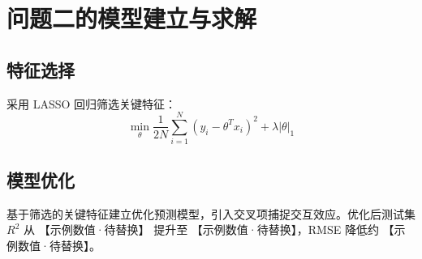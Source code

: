 \section{问题二的模型建立与求解}

\subsection{特征选择}

采用 LASSO 回归筛选关键特征：
\[
  \min_{\theta} \frac{1}{2N} \sum_{i=1}^{N} (y_i - \theta^T x_i)^2 + \lambda |\theta|_1
\]

\subsection{模型优化}

基于筛选的关键特征建立优化预测模型，引入交叉项捕捉交互效应。优化后测试集 $R^2$ 从 【示例数值·待替换】 提升至 【示例数值·待替换】，RMSE 降低约 【示例数值·待替换】。
